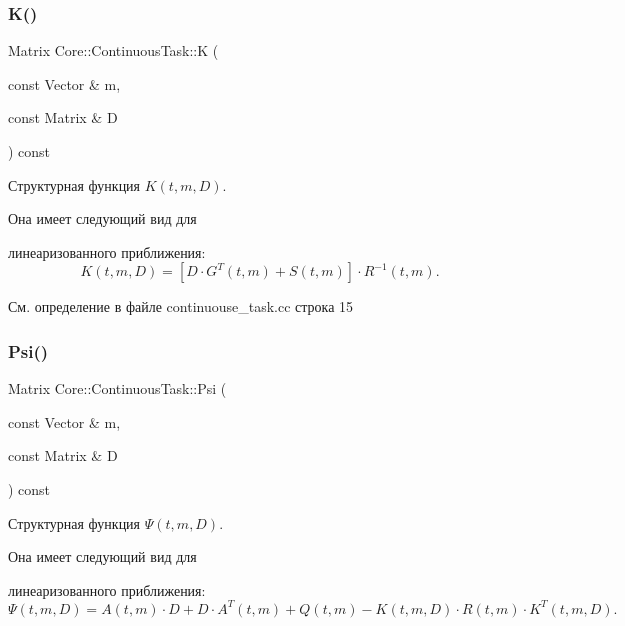 \subsubsection{\texorpdfstring{K()}{K()}}
{\footnotesize\ttfamily Matrix Core\+::\+Continuous\+Task\+::K (\begin{DoxyParamCaption}\item[{const Vector \&}]{m,  }\item[{const Matrix \&}]{D }\end{DoxyParamCaption}) const\hspace{0.3cm}{\ttfamily [virtual]}}



Структурная функция $K(t, m, D)$. 

Она имеет следующий вид для


\begin{DoxyItemize}
\item линеаризованного приближения\+: \[K(t, m, D) = [D \cdot G^T(t,m) + S(t,m)] \cdot R^{-1}(t, m).\] 
\end{DoxyItemize}

См. определение в файле continuouse\+\_\+task.\+cc строка 15

\hypertarget{class_core_1_1_continuous_task_aaf28a2112c6e41e3ac4ff40c95ff71dd}{}\label{class_core_1_1_continuous_task_aaf28a2112c6e41e3ac4ff40c95ff71dd} 
\subsubsection{\texorpdfstring{Psi()}{Psi()}}
{\footnotesize\ttfamily Matrix Core\+::\+Continuous\+Task\+::\+Psi (\begin{DoxyParamCaption}\item[{const Vector \&}]{m,  }\item[{const Matrix \&}]{D }\end{DoxyParamCaption}) const\hspace{0.3cm}{\ttfamily [virtual]}}



Структурная функция $\Psi(t, m, D)$. 

Она имеет следующий вид для


\begin{DoxyItemize}
\item линеаризованного приближения\+: \[\Psi(t, m, D) = A(t,m)\cdot D + D \cdot A^T(t,m) + Q(t,m) - K(t,m,D) \cdot R(t,m) \cdot K^T(t,m,D).\] 
\end{DoxyItemize}

